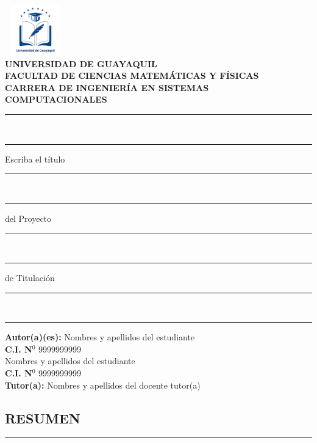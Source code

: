 \documentclass[12pt, a4paper, nofontenc, numbers=endperiod]{apa7}
\begin{document}
		{ %
			\begin{center}	
				\includegraphics[width=2.65cm,height=2.17cm]{Imagenes/Figura1}	 \\  [0.5cm]
				\textbf{ UNIVERSIDAD DE GUAYAQUIL} \\[-0.1cm]
				\textbf{ FACULTAD DE CIENCIAS MATEMÁTICAS Y FÍSICAS} \\ [-0.1cm]
				\textbf{ CARRERA DE INGENIERÍA EN SISTEMAS COMPUTACIONALES} \\ [0.5cm]	
				\footnotesize
				\rule[1mm]{90mm}{0.1mm} \\
				\rule[1mm]{20mm}{0.1mm}  Escriba el título \rule[1mm]{20mm}{0.1mm}\\
				\rule[1mm]{15mm}{0.1mm}  del Proyecto \rule[1mm]{15mm}{0.1mm}\\
				\rule[1mm]{7mm}{0.1mm}  de Titulación \rule[1mm]{7mm}{0.1mm}\\
				\rule[1mm]{20mm}{0.1mm}
			\end{center}
			
			\begin{flushright}
				\begin{minipage}[b]{9.5cm}
					\singlespacing  \hspace*{1.1cm}\textbf{Autor(a)(es):} Nombres y apellidos del estudiante\\
					\hspace*{6cm}\textbf{C.I. N$^{0}$ }9999999999\\
					\hspace*{3.4cm} {\color{red}Nombres y apellidos del estudiante}\\ 
					\hspace*{6cm}\textbf{{\color{red}C.I. N$^{0}$}} {\color{red}9999999999}\\ [0.5cm]
					\hspace*{0.8cm}\textbf{Tutor(a):} Nombres y apellidos del docente tutor(a)	
				\end{minipage}	
			\end{flushright}
			\vspace*{-1cm}
			\begin{center}
				\section*{\large \centering RESUMEN}
				\rule[9mm]{159mm}{0.1mm} 
			\end{center}
			\vspace*{-1.8cm}
			
}
\end{document}

